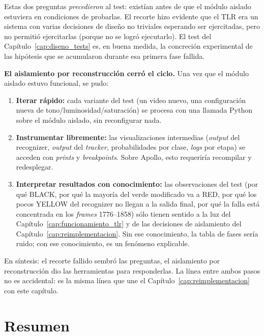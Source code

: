 Estas dos preguntas \textit{precedieron} al test: existían antes de que el módulo aislado estuviera en condiciones de probarlas. El recorte hizo evidente que el TLR era un sistema con varias decisiones de diseño no triviales esperando ser ejercitadas, pero no permitió ejercitarlas (porque no se logró ejecutarlo). El test del Capítulo~\ref{cap:diseno_tests} es, en buena medida, la concreción experimental de las hipótesis que se acumularon durante esa primera fase fallida.

\textbf{El aislamiento por reconstrucción cerró el ciclo.} Una vez que el módulo aislado estuvo funcional, se pudo:

\begin{enumerate}
    \item \textbf{Iterar rápido:} cada variante del test (un video nuevo, una configuración nueva de tono/luminosidad/saturación) se procesa con una llamada Python sobre el módulo aislado, sin reconfigurar nada.

    \item \textbf{Instrumentar libremente:} las visualizaciones intermedias (\textit{output} del recognizer, \textit{output} del \textit{tracker}, probabilidades por clase, \textit{logs} por etapa) se acceden con \textit{prints} y \textit{breakpoints}. Sobre Apollo, esto requeriría recompilar y redesplegar.

    \item \textbf{Interpretar resultados con conocimiento:} las observaciones del test (por qué BLACK, por qué la mayoría del verde modificado va a RED, por qué los pocos YELLOW del recognizer no llegan a la salida final, por qué la falla está concentrada en los \textit{frames} 1776--1858) sólo tienen sentido a la luz del Capítulo~\ref{cap:funcionamiento_tlr} y de las decisiones de aislamiento del Capítulo~\ref{cap:reimplementacion}. Sin ese conocimiento, la tabla de fases sería ruido; con ese conocimiento, es un fenómeno explicable.
\end{enumerate}

En síntesis: el recorte fallido sembró las preguntas, el aislamiento por reconstrucción dio las herramientas para responderlas. La línea entre ambos pasos no es accidental: es la misma línea que une el Capítulo~\ref{cap:reimplementacion} con este capítulo.

\section{Resumen}

